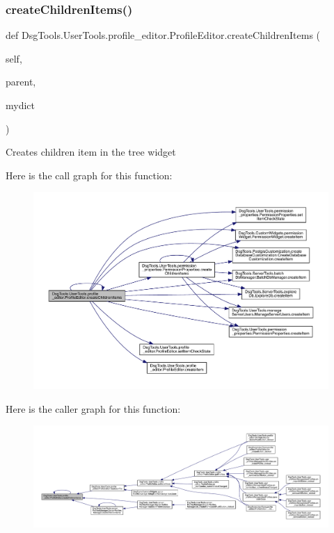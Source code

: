 \subsubsection{\texorpdfstring{create\+Children\+Items()}{createChildrenItems()}}
{\footnotesize\ttfamily def Dsg\+Tools.\+User\+Tools.\+profile\+\_\+editor.\+Profile\+Editor.\+create\+Children\+Items (\begin{DoxyParamCaption}\item[{}]{self,  }\item[{}]{parent,  }\item[{}]{mydict }\end{DoxyParamCaption})}

\begin{DoxyVerb}Creates children item in the tree widget
\end{DoxyVerb}
 Here is the call graph for this function\+:
\nopagebreak
\begin{figure}[H]
\begin{center}
\leavevmode
\includegraphics[width=350pt]{class_dsg_tools_1_1_user_tools_1_1profile__editor_1_1_profile_editor_a4570169729936da5eefeb4db5878c7e4_cgraph}
\end{center}
\end{figure}
Here is the caller graph for this function\+:
\nopagebreak
\begin{figure}[H]
\begin{center}
\leavevmode
\includegraphics[width=350pt]{class_dsg_tools_1_1_user_tools_1_1profile__editor_1_1_profile_editor_a4570169729936da5eefeb4db5878c7e4_icgraph}
\end{center}
\end{figure}
